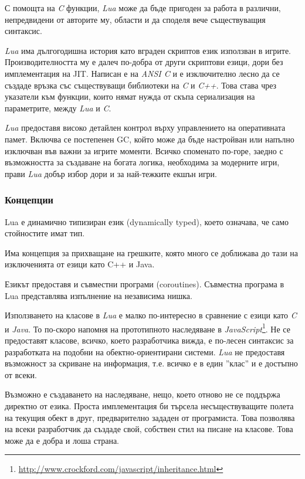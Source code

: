 		С помощта на \emph{C} функции, \emph{Lua} може да бъде пригоден за работа в различни, непредвидени от авторите му,
		области и да споделя вече съществуващия синтаксис.
		
		\emph{Lua} има дългогодишна история като вграден скриптов език използван в игрите. Производителността му
		е далеч по-добра от други скриптови езици, дори без имплементация на \ac{JIT}. Написан е на
		\emph{ANSI C} и е изключително лесно да се създаде връзка със съществуващи библиотеки на \emph{C} и \emph{C++}.
		Това става чрез указатели към функции, които нямат нужда от скъпа сериализация на параметрите, между \emph{Lua} и \emph{C}.
		
		\emph{Lua} предоставя високо детайлен контрол върху управлението на оперативната памет. Включва се
		постепенен \ac{GC}, който може да бъде настройван или напълно изключван във важни за игрите моменти.
		Всичко споменато по-горе, заедно с възможността за създаване на богата логика, необходима за модерните игри,
		прави \emph{Lua} добър избор дори и за най-тежките екшън игри.		
		
		\subsubsection{Концепции}					
		
			Lua е динамично типизиран език (dynamically typed), което означава, че само стойностите имат тип.			
			
			Има концепция за прихващане на грешките, която много се доближава до тази на изключенията от езици като
			C++ и Java.
			
			Езикът предоставя и съвместни програми (coroutines). Съвместна програма в Lua представлява изпълнение на независима нишка.		
			
			Използването на класове в \emph{Lua} е малко по-интересно в сравнение с езици като \emph{C} и \emph{Java}. 
			То по-скоро напомня на прототипното наследяване в
			\emph{JavaScript}\footnote{\url{http://www.crockford.com/javascript/inheritance.html}}.
			Не се предоставят класове, всичко, което разработчика вижда, е по-лесен синтаксис за разработката 
			на подобни на обектно-ориентирани системи.
			\emph{Lua} не предоставя възможност за скриване на информация, т.е. всичко е в един ''клас'' и е достъпно
			от всеки. 
			
			Възможно е създаването на наследяване, нещо, което отново не се поддържа директно от езика. Проста имплементация
			би търсела несъществуващите полета на текущия обект в друг, предварително зададен от програмиста. \cite{Figueiredo}
			Това позволява на всеки разработчик да създаде свой, собствен стил на писане на класове. Това може да е добра и лоша страна.
			
